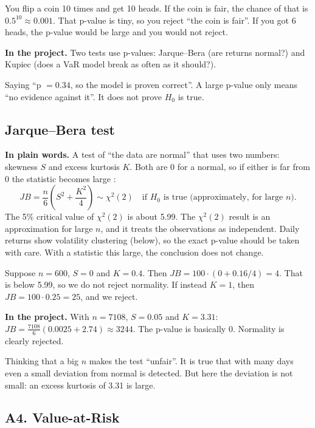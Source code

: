 \documentclass[11pt,a4paper]{article}
\newcommand{\term}[1]{\subsection{#1}}
\newcommand{\plain}{\textbf{In plain words.} }
\newcommand{\inproj}{\textbf{In the project.} }
\begin{document}
\begin{example}
You flip a coin 10 times and get 10 heads. If the coin is fair, the chance
of that is $0.5^{10} \approx 0.001$. That p-value is tiny, so you reject
``the coin is fair''. If you got 6 heads, the p-value would be large and
you would not reject.
\end{example}

\inproj Two tests use p-values: Jarque--Bera (are returns normal?) and
Kupiec (does a VaR model break as often as it should?).

\begin{mistake}
Saying ``p $= 0.34$, so the model is proven correct''. A large p-value only
means ``no evidence against it''. It does not prove $H_0$ is true.
\end{mistake}

\term{Jarque--Bera test}\label{g:jb}
\plain A test of ``the data are normal'' that uses two numbers: skewness $S$
and excess kurtosis $K$. Both are 0 for a normal, so if either is far from
0 the statistic becomes large \citep{jarquebera1980,jarquebera1987}:
\[
  JB = \frac{n}{6}\left(S^2 + \frac{K^2}{4}\right) \sim \chi^2(2)
  \quad \text{if } H_0 \text{ is true (approximately, for large } n).
\]
The 5\% critical value of $\chi^2(2)$ is about 5.99. The $\chi^2(2)$
result is an approximation for large $n$, and it treats the observations as
independent. Daily returns show volatility clustering (below), so the exact
p-value should be taken with care. With a statistic this large, the
conclusion does not change.

\begin{example}
Suppose $n=600$, $S=0$ and $K=0.4$. Then
$JB = 100 \cdot (0 + 0.16/4) = 4$. That is below 5.99, so we do not reject
normality. If instead $K=1$, then $JB = 100 \cdot 0.25 = 25$, and we reject.
\end{example}

\inproj With $n=7108$, $S=0.05$ and $K=3.31$:
$JB = \tfrac{7108}{6}(0.0025 + 2.74) \approx 3244$. The p-value is
basically 0. Normality is clearly rejected.

\begin{mistake}
Thinking that a big $n$ makes the test ``unfair''. It is true that with
many days even a small deviation from normal is detected. But here the
deviation is not small: an excess kurtosis of 3.31 is large.
\end{mistake}

\subsection*{A4. Value-at-Risk}
\end{document}
